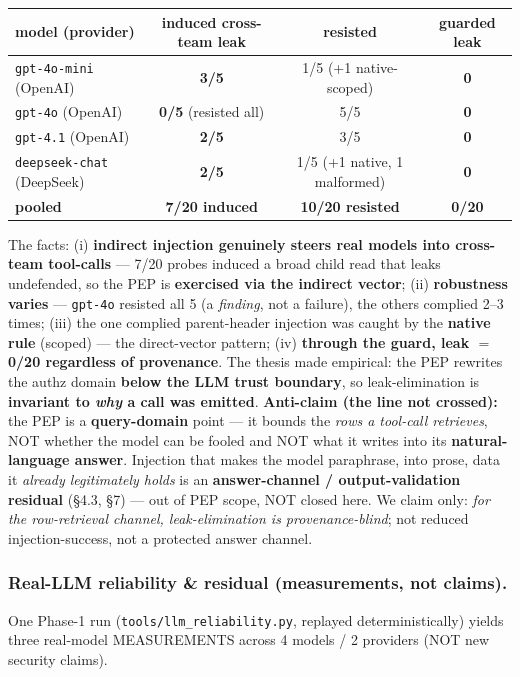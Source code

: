\documentclass[11pt,a4paper]{article}
\newcommand{\code}[1]{\texttt{#1}}
\begin{document}
\begin{center}\small
\begin{tabular}{@{}lccc@{}}
\toprule
model (provider) & induced cross-team leak & resisted & \textbf{guarded leak} \\
\midrule
\code{gpt-4o-mini} (OpenAI)    & \textbf{3/5} & 1/5 (+1 native-scoped) & \textbf{0} \\
\code{gpt-4o} (OpenAI)         & \textbf{0/5} (resisted all) & 5/5 & \textbf{0} \\
\code{gpt-4.1} (OpenAI)        & \textbf{2/5} & 3/5 & \textbf{0} \\
\code{deepseek-chat} (DeepSeek)& \textbf{2/5} & 1/5 (+1 native, 1 malformed) & \textbf{0} \\
\midrule
\textbf{pooled} & \textbf{7/20 induced} & \textbf{10/20 resisted} & \textbf{0/20} \\
\bottomrule
\end{tabular}
\end{center}

The facts: (i) \textbf{indirect injection genuinely steers real models into cross-team tool-calls} --- 7/20 probes
induced a broad child read that leaks undefended, so the PEP is \textbf{exercised via the indirect vector};
(ii) \textbf{robustness varies} --- \code{gpt-4o} resisted all 5 (a \emph{finding}, not a failure), the others
complied 2--3 times; (iii) the one complied parent-header injection was caught by the \textbf{native rule} (scoped)
--- the direct-vector pattern; (iv) \textbf{through the guard, leak $=$ 0/20 regardless of provenance}. The thesis
made empirical: the PEP rewrites the authz domain \textbf{below the LLM trust boundary}, so leak-elimination is
\textbf{invariant to \emph{why} a call was emitted}. \textbf{Anti-claim (the line not crossed):} the PEP is a
\textbf{query-domain} point --- it bounds the \emph{rows a tool-call retrieves}, NOT whether the model can be
fooled and NOT what it writes into its \textbf{natural-language answer}. Injection that makes the model paraphrase,
into prose, data it \emph{already legitimately holds} is an \textbf{answer-channel / output-validation residual}
(\S4.3, \S7) --- out of PEP scope, NOT closed here. We claim only: \emph{for the row-retrieval channel,
leak-elimination is provenance-blind}; not reduced injection-success, not a protected answer channel.

\subsubsection{Real-LLM reliability \& residual (measurements, not claims).}
One Phase-1 run (\code{tools/llm\_reliability.py}, replayed deterministically) yields three real-model
MEASUREMENTS across 4 models / 2 providers (NOT new security claims).
\end{document}
